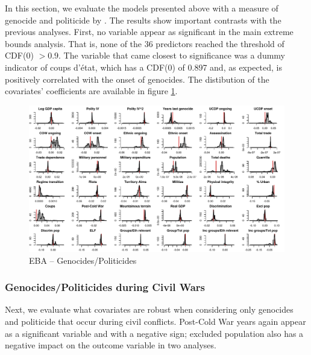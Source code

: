 In this section, we evaluate the models presented above with a measure of genocide and politicide by \citet{harff2003no}. The results show important contrasts with the previous analyses. First, no variable appear as significant in the main extreme bounds analysis. That is, none of the 36 predictors reached the threshold of CDF(0) $> 0.9$. The variable that came closest to significance was a dummy indicator of coups d'état, which has a CDF(0) of 0.897 and, as expected, is positively correlated with the onset of genocides. The distibution of the covariates' coefficients are available in figure \ref{fig:uamk}.

\clearpage
\begin{figure}
    \centering
    \includegraphics[width=\textwidth]{images/uamk.pdf}
    \caption{EBA -- Genocides/Politicides}
    \label{fig:uamk}
\end{figure}
\clearpage

\subsubsection{Genocides/Politicides during Civil Wars}

Next, we evaluate what covariates are robust when considering only genocides and politicide that occur during civil conflicts. Post-Cold War years again appear as a significant variable and with a negative sign; excluded population also has a negative impact on the outcome variable in two analyses.

\vspace{1cm}

